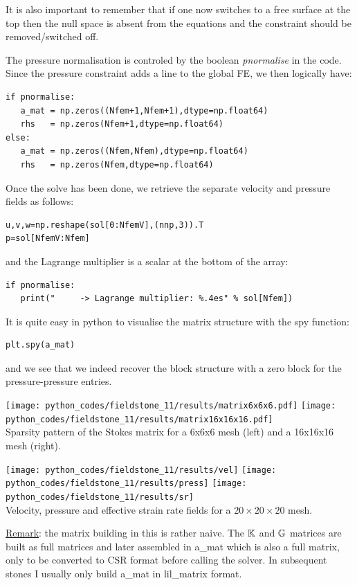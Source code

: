 It is also important to remember that if one now switches to a free surface at the top then 
the null space is absent from the equations and the constraint should be removed/switched off.

The pressure normalisation is controled by the boolean {\sl pnormalise} in the code. 
Since the pressure constraint adds a line to the global FE, we then logically have:
\begin{lstlisting}
if pnormalise:
   a_mat = np.zeros((Nfem+1,Nfem+1),dtype=np.float64) 
   rhs   = np.zeros(Nfem+1,dtype=np.float64)    
else:
   a_mat = np.zeros((Nfem,Nfem),dtype=np.float64)
   rhs   = np.zeros(Nfem,dtype=np.float64)       
\end{lstlisting} 
Once the solve has been done, we retrieve the separate velocity and pressure fields as follows:
\begin{lstlisting}
u,v,w=np.reshape(sol[0:NfemV],(nnp,3)).T
p=sol[NfemV:Nfem]
\end{lstlisting} 
and the Lagrange multiplier is a scalar at the bottom of the array:
\begin{lstlisting}
if pnormalise:
   print("     -> Lagrange multiplier: %.4es" % sol[Nfem])
\end{lstlisting} 

It is quite easy in python to visualise the matrix structure 
with the spy function:
\begin{lstlisting}
plt.spy(a_mat)
\end{lstlisting} 
and we see that we indeed recover
the block structure with a zero block for the pressure-pressure entries.  
\begin{center}
\texttt{[image: python\_codes/fieldstone\_11/results/matrix6x6x6.pdf]}
\texttt{[image: python\_codes/fieldstone\_11/results/matrix16x16x16.pdf]}\\
{\captionfont Sparsity pattern of the Stokes matrix for a 6x6x6 mesh (left) and a 16x16x16 mesh (right).}
\end{center}

\begin{center}
\texttt{[image: python\_codes/fieldstone\_11/results/vel]}
\texttt{[image: python\_codes/fieldstone\_11/results/press]}
\texttt{[image: python\_codes/fieldstone\_11/results/sr]}\\
{\captionfont Velocity, pressure and effective strain rate fields for a $20\times 20\times 20$ mesh.}
\end{center}


\underline{Remark}: the matrix building in this \stone is rather naive. The 
${\mathbb{K}}$ and ${\mathbb{G}}$ matrices are built as full matrices and later assembled
in {\python a\_mat} which is also a full matrix, only to be converted 
to CSR format before calling the solver. 
In subsequent stones I usually only build {\python a\_mat} in {\python lil\_matrix} format.


 
